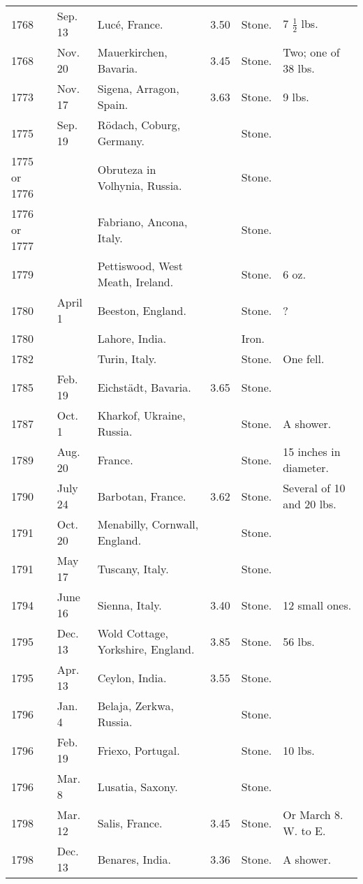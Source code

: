 \documentclass[a4paper, 12pt, oneside]{article}
\begin{document}
\begin{center}
\begin{longtable}{|p{10mm}|p{15mm}|p{32mm}|p{13mm}|p{13mm}|p{26mm}|}
        1768 & Sep. 13 & Lucé, France. & 3.50 & Stone. & 7 $\frac{1}{2}$ lbs. \\
        1768 & Nov. 20 & Mauerkirchen, Bavaria. & 3.45 & Stone. & Two; one of 38 lbs. \\
        1773 & Nov. 17 & Sigena, Arragon, Spain. & 3.63 & Stone. & 9 lbs. \\
        1775 & Sep. 19 & Rödach, Coburg, Germany. & ~ & Stone. & ~ \\
        1775 or 1776 & ~ & Obruteza in Volhynia, Russia. & ~ & Stone. & ~ \\
        1776 or 1777 & ~ & Fabriano, Ancona, Italy. & ~ & Stone. & ~ \\
        1779 & ~ & Pettiswood, West Meath, Ireland. & ~ & Stone. & 6 oz. \\
        1780 & April 1 & Beeston, England. & ~ & Stone. & ? \\
        1780 & ~ & Lahore, India. & ~ & Iron. & ~ \\
        1782 & ~ & Turin, Italy. & ~ & Stone. & One fell. \\
        1785 & Feb. 19 & Eichstädt, Bavaria. & 3.65 & Stone. & ~ \\
        1787 & Oct. 1 & Kharkof, Ukraine, Russia. & ~ & Stone. & A shower. \\
        1789 & Aug. 20 & France. & ~ & Stone. & 15 inches in diameter. \\
        1790 & July 24 & Barbotan, France. & 3.62 & Stone. & Several of 10 and 20 lbs. \\
        1791 & Oct. 20 & Menabilly, Cornwall, England. & ~ & Stone. & ~ \\
        1791 & May 17 & Tuscany, Italy. & ~ & Stone. & ~ \\
        1794 & June 16 & Sienna, Italy. & 3.40 & Stone. & 12 small ones. \\
        1795 & Dec. 13 & Wold Cottage, Yorkshire, England. & 3.85 & Stone. & 56 lbs. \\
        1795 & Apr. 13 & Ceylon, India. & 3.55 & Stone. & ~ \\
        1796 & Jan. 4 & Belaja, Zerkwa, Russia. & ~ & Stone. & ~ \\
        1796 & Feb. 19 & Friexo, Portugal. & ~ & Stone. & 10 lbs. \\
        1796 & Mar. 8 & Lusatia, Saxony. & ~ & Stone. & ~ \\
        1798 & Mar. 12 & Salis, France. & 3.45 & Stone. & Or March 8. W. to E. \\
        1798 & Dec. 13 & Benares, India. & 3.36 & Stone. & A shower. \\

\end{longtable}
\end{center}
\end{document}
